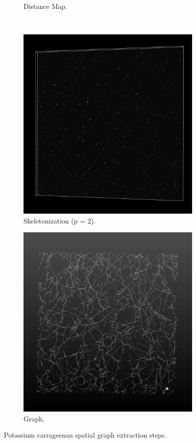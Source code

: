 \begin{figure}[H]
\begin{subfigure}{0.5\textwidth}
    \caption{Distance Map.}
    \label{subfig:carra_dmap}
  \end{subfigure}\\[1ex]
  \begin{subfigure}{0.5\textwidth}
    \centering
    \includegraphics[width=0.9\linewidth]{Figures/chapter-image/pipeline_screenshots/carra_skeleton_tile1.png}
    \caption{Skeletonization (p = 2).}
    \label{subfig:carra_skeleton}
  \end{subfigure}%
  \begin{subfigure}{0.5\textwidth}
    \centering
    \includegraphics[width=0.9\linewidth]{Figures/chapter-image/pipeline_screenshots/carra_graph_tile1.png}
    \caption{Graph.}
    \label{fig:carra_graph}
  \end{subfigure}%
  \caption{Potassium carrageenan spatial graph extraction steps.}
  \label{fig:carra_all}
\end{figure}

